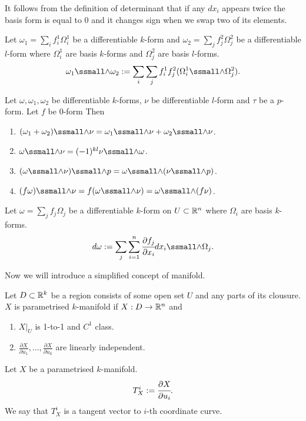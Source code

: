 \documentclass[main.tex]{subfiles}
\begin{document}
It follows from the definition of determinant that if any $dx_i$ appears twice the basis form is equal to $0$ and it changes sign when we swap two of its elements.
\begin{definition}
Let $\omega_1 = \sum_i f^1_i \Omega^1_i$ be a differentiable $k$-form and $\omega_2 = \sum_j f^2_j \Omega^2_j$ be a differentiable $l$-form where $\Omega^1_i$ are basis $k$-forms and $\Omega^2_j$ are basis $l$-forms.
\begin{equation}
\omega_1 \form \omega_2 :=  \sum_i \sum_j f^1_i f^2_j (\Omega^1_i \form \Omega^2_j).
\end{equation}
\end{definition}
\begin{theorem}
Let $\omega, \omega_1, \omega_2$ be differentiable $k$-forms, $\nu$ be differentiable $l$-form and $\tau$ be a $p$-form. Let $f$ be $0$-form Then
\begin{enumerate}
\item $(\omega_1 + \omega_2)\form \nu = \omega_1\form \nu + \omega_2\form \nu$.
\item $\omega\form \nu = (-1)^{kl}\nu\form\omega$.
\item $(\omega\form \nu) \form p = \omega\form(\nu\form p)$.
\item $(f\omega)\form \nu = f(\omega\form \nu) = \omega\form (f\nu)$. 
\end{enumerate}
\end{theorem}
\begin{definition}
Let $\omega = \sum_j f_j \Omega_j$ be a differentiable $k$-form on $U\subset\mathbb{R}^n$ where $\Omega_i$ are basis $k$-forms.
\begin{equation}
d\omega := \sum_j \sum_{i=1}^n \cfrac{\partial f_j}{\partial x_i} dx_i \form \Omega_j. 
\end{equation}
\end{definition}
Now we will introduce a simplified concept of manifold.
\begin{definition}
Let $D\subset \mathbb{R}^k$ be a region consists of some open set $U$ and any parts of its clousure.
$X$ is parametrised $k$-manifold if
$X:D\to \mathbb{R}^n$ and
\begin{enumerate}
\item
$X|_U$ is 1-to-1 and $C^1$ class.
\item
$\frac{\partial X}{\partial u_1}, \dots, \frac{\partial X}{\partial u_k}$ are linearly independent.
\end{enumerate}
\end{definition}
\begin{definition}
Let $X$ be a parametrised $k$-manifold.
\begin{equation}
T^i_X := \cfrac{\partial X}{\partial u_i}.
\end{equation}
We say that $T^i_X$ is a tangent vector to $i$-th coordinate curve. 
\end{definition}
\end{document}
